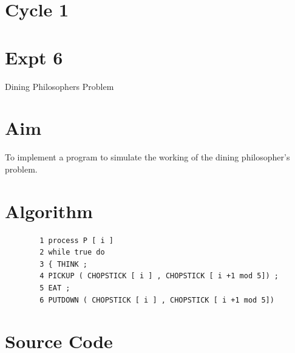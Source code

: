 \documentclass[13pt,oneside]{book}
\begin{document}
\section*{Cycle 1}
\section*{Expt 6}
\begin{center}
    \Large{Dining Philosophers Problem}
\end{center}
\section*{Aim}
\large
To implement a program to simulate the working of the dining
philosopher’s problem.

\section*{Algorithm} 
    \begin{verbatim}
		1 process P [ i ]
		2 while true do
		3 { THINK ;
		4 PICKUP ( CHOPSTICK [ i ] , CHOPSTICK [ i +1 mod 5]) ;
		5 EAT ;
		6 PUTDOWN ( CHOPSTICK [ i ] , CHOPSTICK [ i +1 mod 5])
	\end{verbatim}

\section*{Source Code}
\small
\end{document}
